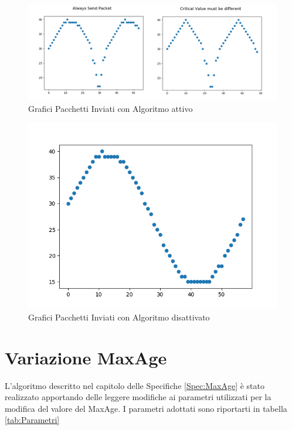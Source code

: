       \begin{center}
        \begin{figure}
          \centering
          \includegraphics[width=\linewidth]{../Immagini/MergeOn.png}
          \caption{Grafici Pacchetti Inviati con Algoritmo attivo}
          \label{fig:mergeOn}
        \end{figure}

        \begin{figure}
          \centering
          \includegraphics[width=\linewidth]{../Immagini/OFF.png}
          \caption{Grafici Pacchetti Inviati con Algoritmo disattivato}
          \label{fig:off}
        \end{figure}
      \end{center}

    \section{Variazione MaxAge}
      L'algoritmo descritto nel capitolo delle Specifiche \ref{Spec:MaxAge} è stato realizzato apportando delle leggere modifiche ai parametri utilizzati per la modifica del valore del MaxAge. I parametri adottati sono riportarti in tabella \ref{tab:Parametri}


